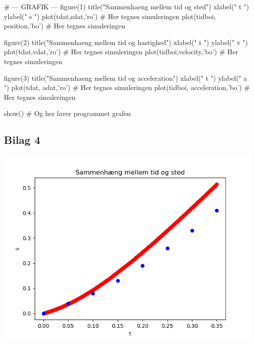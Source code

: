 \documentclass[12pt]{article}
\begin{document}
\begin{python}
        # --- GRAFIK ---
        figure(1)
        title("Sammenhaeng mellem tid og sted")
        xlabel(" t ")
        ylabel(" s ")
        plot(tdat,sdat,'ro')    # Her tegnes simuleringen
        plot(tidboi, position,'bo')    # Her tegnes simuleringen

        figure(2)
        title("Sammenhaeng mellem tid og hastighed")
        xlabel(" t ")
        ylabel(" v ")
        plot(tdat,vdat,'ro')    # Her tegnes simuleringen
        plot(tidboi,velocity,'bo')    # Her tegnes simuleringen

        figure(3)
        title("Sammenhaeng mellem tid og acceleration")
        xlabel(" t ")
        ylabel(" a ")
        plot(tdat, adat,'ro')    # Her tegnes simuleringen
        plot(tidboi, acceleration,'bo')    # Her tegnes simuleringen

        show()                  # Og her laver programmet grafen
\end{python}

\subsection*{Bilag 4}
\begin{center}
\includegraphics[width=\linewidth]{sted.png}
\end{center}
\end{document}
